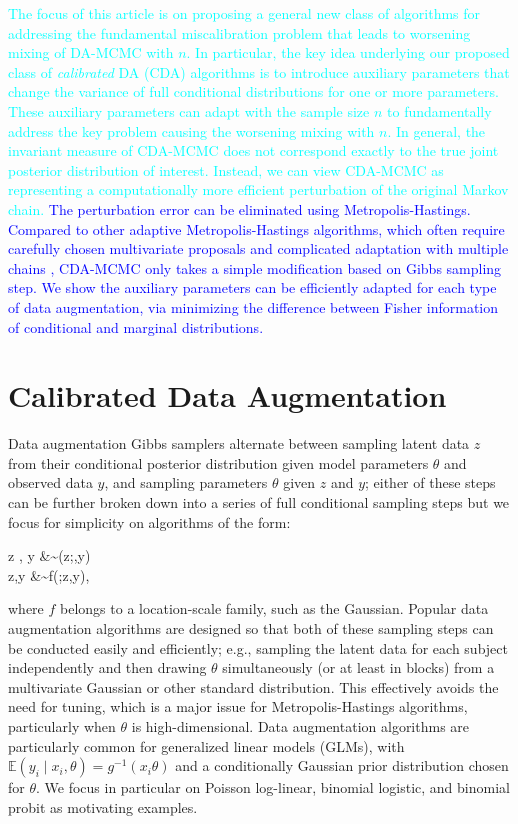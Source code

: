 \documentclass[11pt]{article}
\newcommand{\leojames}[1]{\textcolor{blue}{#1}}
\newcommand{\dave}[1]{{\textcolor{cyan}{#1}}}
\newcommand{\be}{\begin{equs}}
\newcommand{\ee}{\end{equs}}
\newcommand{\bb}[1]{\mathbb{#1}}
\begin{document}
\dave{The focus of this article is on proposing a general new class of algorithms for addressing the fundamental miscalibration problem that leads to worsening mixing of  DA-MCMC with $n$.  In particular, the key idea underlying our proposed class of {\em calibrated} DA (CDA) algorithms is to introduce auxiliary parameters that change the variance of full conditional distributions for one or more parameters. These auxiliary parameters can adapt with the sample size $n$ to fundamentally address the key problem causing the worsening mixing with $n$.  In general, the invariant measure of CDA-MCMC does not correspond exactly to the true joint posterior distribution of interest. Instead, we can view CDA-MCMC as representing a computationally more efficient perturbation of the original Markov chain. \leojames{ The perturbation error can be eliminated using Metropolis-Hastings. Compared to other adaptive Metropolis-Hastings algorithms,
which often require carefully chosen multivariate proposals and complicated adaptation with multiple chains  \citep{tran2016adaptive}, CDA-MCMC only
takes a simple modification based on Gibbs sampling step. We show the auxiliary parameters can be efficiently adapted for each type of data augmentation, via minimizing
the difference between Fisher information of conditional and
marginal distributions.}}


\section{Calibrated Data Augmentation} \label{sec:cda}
Data augmentation Gibbs samplers alternate between sampling  latent data $z$ from their conditional posterior distribution given model parameters $\theta$ and observed data $y$, and sampling parameters $\theta$ given $z$ and $y$; either of these steps can be further broken down into a series of full conditional sampling steps but we focus for simplicity on algorithms of the form: 
\be \label{eq:da}
z \mid \theta, y &\sim \pi(z;\theta,y) \\
\theta \mid z,y &\sim f(\theta;z,y),
\ee
where $f$ belongs to a location-scale family, such as the Gaussian.  Popular data augmentation algorithms are designed so that both of these sampling steps can be conducted easily and efficiently; e.g., sampling the latent data for each subject independently and then drawing $\theta$ simultaneously (or at least in blocks) from a multivariate Gaussian or other standard distribution.  This effectively avoids the need for tuning, which is a major issue for Metropolis-Hastings algorithms, particularly when $\theta$ is high-dimensional.
Data augmentation algorithms are particularly common for generalized linear models (GLMs), with $\bb E(y_i \mid x_i, \theta) = g^{-1}(x_i \theta)$ and a conditionally Gaussian prior distribution chosen for $\theta$. We focus in particular on Poisson log-linear, binomial logistic, and binomial probit as motivating examples.
\end{document}

